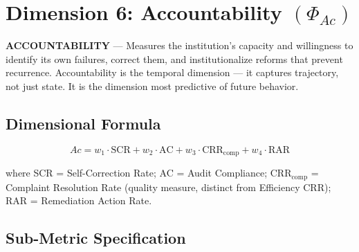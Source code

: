 \documentclass[a4paper,11pt]{article}
\begin{document}
	\newpage
	\section{Dimension 6: Accountability \texorpdfstring{$(\Phi_{Ac})$}{}}
	
	\begin{dimensionbox}
		\textbf{\sffamily ACCOUNTABILITY} — Measures the institution's capacity and willingness to identify its own failures, correct them, and institutionalize reforms that prevent recurrence. Accountability is the temporal dimension — it captures trajectory, not just state. It is the dimension most predictive of future behavior.
	\end{dimensionbox}
	
	\subsection{Dimensional Formula}
	
	\[
	Ac = w_1 \cdot \text{SCR} + w_2 \cdot \text{AC} + w_3 \cdot \text{CRR}_{\text{comp}} + w_4 \cdot \text{RAR}
	\]
	
	\noindent where SCR = Self-Correction Rate; AC = Audit Compliance; $\text{CRR}_{\text{comp}}$ = Complaint Resolution Rate (quality measure, distinct from Efficiency CRR); RAR = Remediation Action Rate.
	
	\subsection{Sub-Metric Specification}
	
\end{document}
